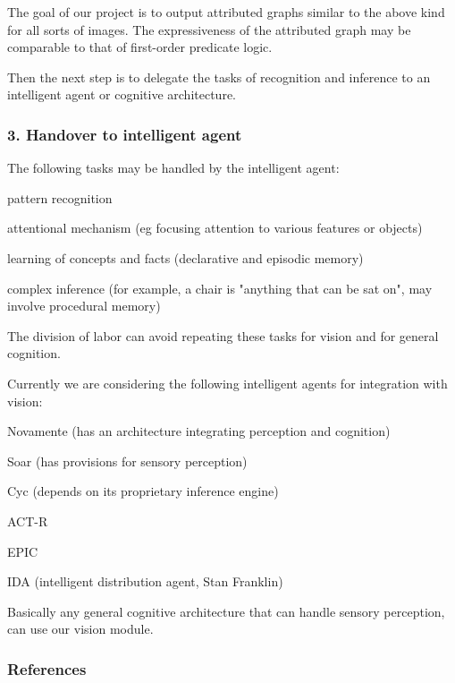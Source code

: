 The goal of our project is to output attributed graphs similar to the above kind for all sorts of images. The expressiveness of the attributed graph may be comparable to that of first-order predicate logic.

 Then the next step is to delegate the tasks of recognition and inference to an intelligent agent or cognitive architecture.

\subsubsection{3. Handover to intelligent agent}

The following tasks may be handled by the intelligent agent:
\begin{compactenum}
	\item pattern recognition
	\item attentional mechanism (eg focusing attention to various features or objects)
	\item learning of concepts and facts (declarative and episodic memory)
	\item complex inference (for example, a chair is "anything that can be sat on", may involve procedural memory)
\end{compactenum}

The division of labor can avoid repeating these tasks for vision and for general cognition.

Currently we are considering the following intelligent agents for integration with vision:
\begin{compactenum}
	\item Novamente (has an architecture integrating perception and cognition)
	\item Soar (has provisions for sensory perception)
	\item Cyc (depends on its proprietary inference engine)
	\item ACT-R
	\item EPIC
	\item IDA (intelligent distribution agent, Stan Franklin)
\end{compactenum}

Basically any general cognitive architecture that can handle sensory perception, can use our vision module.

\subsubsection{References}

